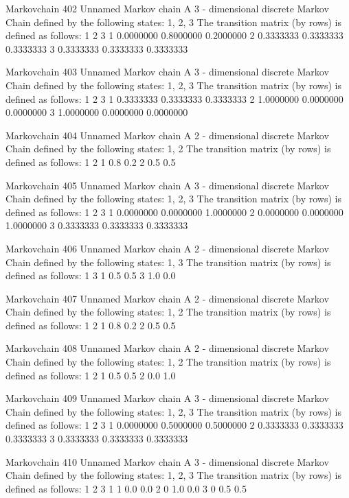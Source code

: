 \documentclass[
  nojss]{jss}
\begin{document}
\begin{CodeChunk}
\begin{CodeOutput}
Markovchain  402 
Unnamed Markov chain 
 A  3 - dimensional discrete Markov Chain defined by the following states: 
 1, 2, 3 
 The transition matrix  (by rows)  is defined as follows: 
          1         2         3
1 0.0000000 0.8000000 0.2000000
2 0.3333333 0.3333333 0.3333333
3 0.3333333 0.3333333 0.3333333

Markovchain  403 
Unnamed Markov chain 
 A  3 - dimensional discrete Markov Chain defined by the following states: 
 1, 2, 3 
 The transition matrix  (by rows)  is defined as follows: 
          1         2         3
1 0.3333333 0.3333333 0.3333333
2 1.0000000 0.0000000 0.0000000
3 1.0000000 0.0000000 0.0000000

Markovchain  404 
Unnamed Markov chain 
 A  2 - dimensional discrete Markov Chain defined by the following states: 
 1, 2 
 The transition matrix  (by rows)  is defined as follows: 
    1   2
1 0.8 0.2
2 0.5 0.5

Markovchain  405 
Unnamed Markov chain 
 A  3 - dimensional discrete Markov Chain defined by the following states: 
 1, 2, 3 
 The transition matrix  (by rows)  is defined as follows: 
          1         2         3
1 0.0000000 0.0000000 1.0000000
2 0.0000000 0.0000000 1.0000000
3 0.3333333 0.3333333 0.3333333

Markovchain  406 
Unnamed Markov chain 
 A  2 - dimensional discrete Markov Chain defined by the following states: 
 1, 3 
 The transition matrix  (by rows)  is defined as follows: 
    1   3
1 0.5 0.5
3 1.0 0.0

Markovchain  407 
Unnamed Markov chain 
 A  2 - dimensional discrete Markov Chain defined by the following states: 
 1, 2 
 The transition matrix  (by rows)  is defined as follows: 
    1   2
1 0.8 0.2
2 0.5 0.5

Markovchain  408 
Unnamed Markov chain 
 A  2 - dimensional discrete Markov Chain defined by the following states: 
 1, 2 
 The transition matrix  (by rows)  is defined as follows: 
    1   2
1 0.5 0.5
2 0.0 1.0

Markovchain  409 
Unnamed Markov chain 
 A  3 - dimensional discrete Markov Chain defined by the following states: 
 1, 2, 3 
 The transition matrix  (by rows)  is defined as follows: 
          1         2         3
1 0.0000000 0.5000000 0.5000000
2 0.3333333 0.3333333 0.3333333
3 0.3333333 0.3333333 0.3333333

Markovchain  410 
Unnamed Markov chain 
 A  3 - dimensional discrete Markov Chain defined by the following states: 
 1, 2, 3 
 The transition matrix  (by rows)  is defined as follows: 
  1   2   3
1 1 0.0 0.0
2 0 1.0 0.0
3 0 0.5 0.5


\end{CodeOutput}
\end{CodeChunk}
\end{document}
